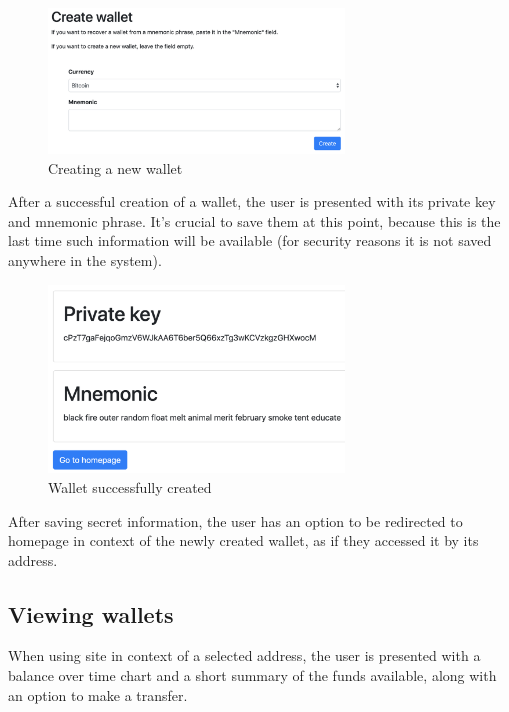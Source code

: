 \begin{figure}[ht]
    \centering
    \includegraphics[width=0.7\textwidth]{assets/create-wallet.png}
    \caption{Creating a new wallet}
    \label{5:fig:create-wallet}
\end{figure}

After a successful creation of a wallet, the user is presented
with its private key and mnemonic phrase.
It's crucial to save them at this point,
because this is the last time such information will be available
(for security reasons it is not saved anywhere in the system).

\begin{figure}[ht]
    \centering
    \includegraphics[width=0.7\textwidth]{assets/wallet-created.png}
    \caption{Wallet successfully created}
    \label{5:fig:wallet-created}
\end{figure}

After saving secret information, the user has an option
to be redirected to homepage in context of the newly created wallet,
as if they accessed it by its address.

\newpage

\subsection{Viewing wallets}

When using site in context of a selected address,
the user is presented with a balance over time chart and a short summary
of the funds available,
along with an option to make a transfer.


